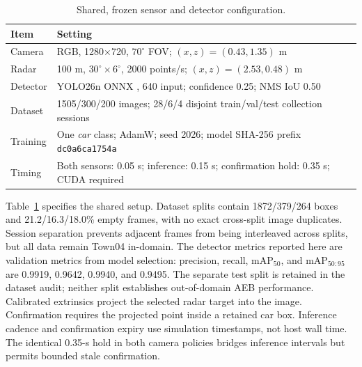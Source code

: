 \documentclass[conference]{IEEEtran}
\begin{document}
\begin{table}[t]
\caption{Shared, frozen sensor and detector configuration.}
\label{tab:setup}
\centering\scriptsize
\setlength{\tabcolsep}{3pt}
\begin{tabular}{p{}p{}}
\toprule Item & Setting\\ \midrule
Camera & RGB, 1280$\times$720, $70^\circ$ FOV; $(x,z)=(0.43,1.35)$ m\\
Radar & 100 m, $30^\circ\!\times6^\circ$, 2000 points/s; $(x,z)=(2.53,0.48)$ m\\
Detector & YOLO26n ONNX \cite{ultralytics_yolo}, 640 input; confidence 0.25; NMS IoU 0.50\\
Dataset & 1505/300/200 images; 28/6/4 disjoint train/val/test collection sessions\\
Training & One \emph{car} class; AdamW; seed 2026; model SHA-256 prefix \texttt{dc0a6ca1754a}\\
Timing & Both sensors: 0.05 s; inference: 0.15 s; confirmation hold: 0.35 s; CUDA required\\
\bottomrule
\end{tabular}
\end{table}

Table~\ref{tab:setup} specifies the shared setup. Dataset splits contain
1872/379/264 boxes and 21.2/16.3/18.0\% empty frames, with no exact cross-split
image duplicates. Session separation prevents adjacent frames from being
interleaved across splits, but all data remain Town04 in-domain. The detector
metrics reported here are validation metrics from model selection: precision,
recall, $\mathrm{mAP}_{50}$, and $\mathrm{mAP}_{50:95}$ are 0.9919, 0.9642,
0.9940, and 0.9495. The separate test split is retained in the dataset audit;
neither split establishes out-of-domain AEB performance. Calibrated extrinsics project the selected radar target into
the image. Confirmation requires the projected point inside a retained car box.
Inference cadence and confirmation expiry use simulation timestamps, not host
wall time. The identical 0.35-s hold in both camera policies bridges inference
intervals but permits bounded stale confirmation.
\end{document}
